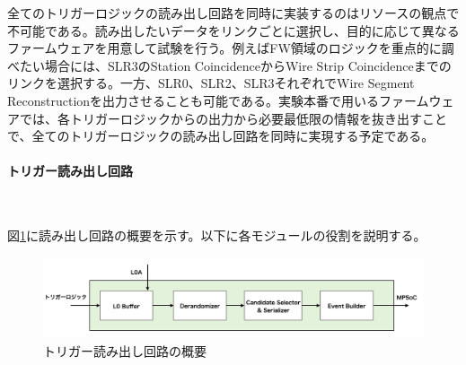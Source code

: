 全てのトリガーロジックの読み出し回路を同時に実装するのはリソースの観点で不可能である。読み出したいデータをリンクごとに選択し、目的に応じて異なるファームウェアを用意して試験を行う。例えばFW領域のロジックを重点的に調べたい場合には、SLR3のStation CoincidenceからWire Strip Coincidenceまでのリンクを選択する。一方、SLR0、SLR2、SLR3それぞれでWire Segment Reconstructionを出力させることも可能である。実験本番で用いるファームウェアでは、各トリガーロジックからの出力から必要最低限の情報を抜き出すことで、全てのトリガーロジックの読み出し回路を同時に実現する予定である。

\paragraph{トリガー読み出し回路}　　
\par
図\ref{Readout_Circuite}に読み出し回路の概要を示す。以下に各モジュールの役割を説明する。

\begin{figure} 
\centering
\includegraphics[width=16cm]{fig/Test/Readout_Circuite.png}
\caption[トリガー読み出し回路の概要]{トリガー読み出し回路の概要}
\label{Readout_Circuite}
\end{figure}

